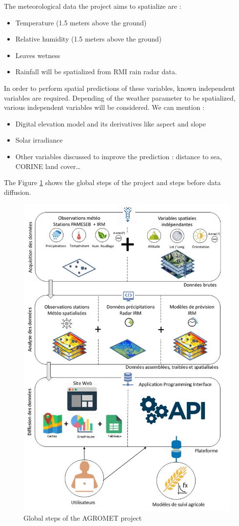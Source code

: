 \documentclass[12pt,twoside]{reedthesis}
\providecommand{\tightlist}{%
  \setlength{\itemsep}{0pt}\setlength{\parskip}{0pt}}
\theoremstyle{definition}
\theoremstyle{definition}
\theoremstyle{definition}
\theoremstyle{remark}
\begin{document}
The meteorological data the project aims to spatialize are :
\begin{itemize}
\tightlist
\item
  Temperature (1.5 meters above the ground)
\item
  Relative humidity (1.5 meters above the ground)
\item
  Leaves wetness
\item
  Rainfall will be spatialized from RMI rain radar data.
\end{itemize}
In order to perform spatial predictions of these variables, known
independent variables are required. Depending of the weather parameter
to be spatialized, various independent variables will be considered. We
can mention :
\begin{itemize}
\tightlist
\item
  Digital elevation model and its derivatives like aspect and slope
\item
  Solar irradiance
\item
  Other variables discussed to improve the prediction : distance to sea,
  CORINE land cover\ldots{}
\end{itemize}
The Figure \ref{fig:agromet} shows the global steps of the project and
steps before data diffusion.
\begin{figure}

{\centering \includegraphics[width=0.65\linewidth]{figure/agromet} 

}

\caption{Global steps of the AGROMET project}\label{fig:agromet}
\end{figure}
\end{document}
